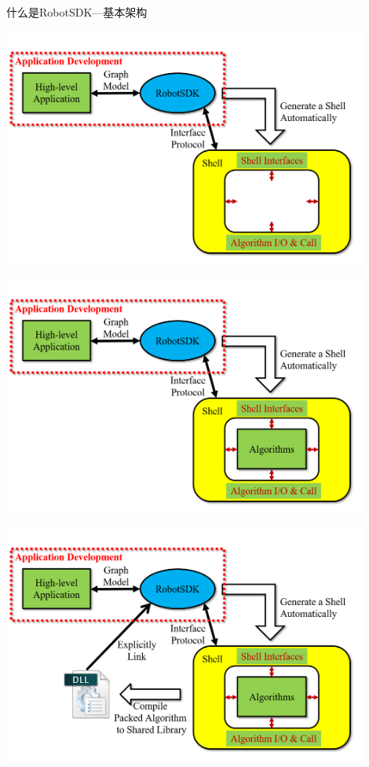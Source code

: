 \documentclass[9pt]{beamer}
\begin{document}
\begin{frame}[allowframebreaks]{什么是RobotSDK---基本架构}
\begin{center}
		\end{center}
		\begin{center}
			\includegraphics[width=0.9\textwidth]{./img/frame5}
		\end{center}
		\begin{center}
			\includegraphics[width=0.9\textwidth]{./img/frame6}
		\end{center}
		\begin{center}
			\includegraphics[width=0.9\textwidth]{./img/frame7}

\end{center}
\end{frame}
\end{document}
